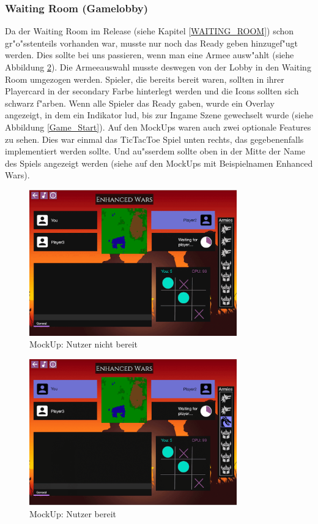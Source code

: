 \documentclass[12pt, titlepage]{scrartcl}
\newcommand{\RN}[1]{%
	\textup{\uppercase\expandafter{\romannumeral#1}}%
}
\begin{document}
		    \subsubsection{Waiting Room (Gamelobby)}
		        Da der Waiting Room im Release \RN{2} (siehe Kapitel \ref{WAITING_ROOM}) schon gr"o"sstenteils vorhanden war, musste nur noch das Ready geben hinzugef"ugt werden. Dies sollte bei uns passieren, wenn man eine Armee ausw"ahlt (siehe Abbildung \ref{Ready}). Die Armeeauswahl musste deswegen von der Lobby in den Waiting Room umgezogen werden. Spieler, die bereits bereit waren, sollten in ihrer Playercard in der secondary Farbe hinterlegt werden und die Icons sollten sich schwarz f"arben. Wenn alle Spieler das Ready gaben, wurde ein Overlay angezeigt, in dem ein Indikator lud, bis zur Ingame Szene gewechselt wurde (siehe Abbildung \ref{Game_Start}). Auf den MockUps waren auch zwei optionale Features zu sehen. Dies war einmal das TicTacToe Spiel unten rechts, das gegebenenfalls implementiert werden sollte. Und au"sserdem sollte oben in der Mitte der Name des Spiels angezeigt werden (siehe auf den MockUps mit Beispielnamen \glqq Enhanced Wars\grqq). \\
		        \begin{figure}[H] 
    				\centering
    				\includegraphics[width=0.8\textwidth]{images/mockUps/NotReady.png}
    				\caption{MockUp: Nutzer nicht bereit}
    				\label{Not_Ready}
			    \end{figure}
			    \begin{figure}[H] 
    				\centering
    				\includegraphics[width=0.8\textwidth]{images/mockUps/Ready.png}
    				\caption{MockUp: Nutzer bereit}
    				\label{Ready}
			    \end{figure}
\end{document}
